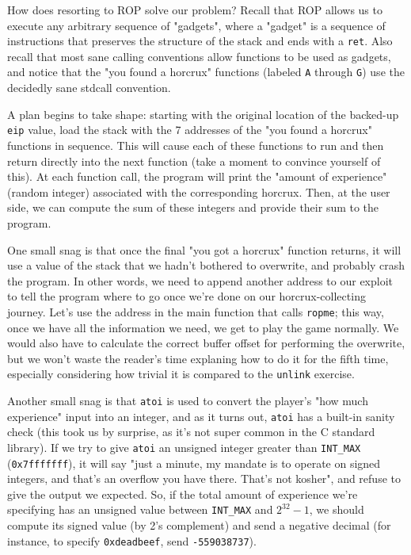 \documentclass{article}
\newcommand{\xcode}[2]{\colorbox{ubuntuback}{\lstinline[language=#1]|#2|}}
\newcommand{\asm}[1]{\xcode{{[x86masm]assembler}}{#1}}
\newcommand{\code}[1]{\colorbox{ubuntuback}{\texttt{#1}}}
\begin{document}
How does resorting to ROP solve our problem? Recall that ROP allows us to execute any arbitrary sequence of "gadgets", where a "gadget" is a sequence of instructions that preserves the structure of the stack and ends with a \asm{ret}. Also recall that most sane calling conventions allow functions to be used as gadgets, and notice that the "you found a horcrux" functions (labeled \xcode{C}{A} through \xcode{C}{G}) use the decidedly sane stdcall convention.

A plan begins to take shape: starting with the original location of the backed-up \asm{eip} value, load the stack with the 7 addresses of the "you found a horcrux" functions in sequence. This will cause each of these functions to run and then return directly into the next function (take a moment to convince yourself of this). At each function call, the program will print the "amount of experience" (random integer) associated with the corresponding horcrux. Then, at the user side, we can compute the sum of these integers and provide their sum to the program.

One small snag is that once the final "you got a horcrux" function returns, it will use a value of the stack that we hadn't bothered to overwrite, and probably crash the program. In other words, we need to append another address to our exploit to tell the program where to go once we're done on our horcrux-collecting journey. Let's use the address in the main function that calls \xcode{C}{ropme}; this way, once we have all the information we need, we get to play the game normally.  We would also have to calculate the correct buffer offset for performing the overwrite, but we won't waste the reader's time explaning how to do it for the fifth time, especially considering how trivial it is compared to the \code{unlink} exercise. 

Another small snag is that \xcode{C}{atoi} is used to convert the player's "how much experience" input into an integer, and as it turns out, \xcode{C}{atoi} has a built-in sanity check (this took us by surprise, as it's not super common in the C standard library). If we try to give \xcode{C}{atoi} an unsigned integer greater than \code{INT\_MAX} (\code{0x7fffffff}), it will say "just a minute, my mandate is to operate on signed integers, and that's an overflow you have there. That's not kosher", and refuse to give the output we expected. So, if the total amount of experience we're specifying has an unsigned value between \code{INT\_MAX} and $2^{32}-1$, we should compute its signed value (by 2's complement) and send a negative decimal (for instance, to specify \code{0xdeadbeef}, send \code{-559038737}).
\end{document}
